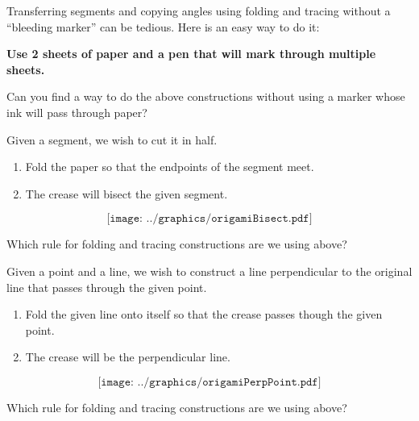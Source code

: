 Transferring segments and copying angles using folding and tracing without a
``bleeding marker'' can be tedious. Here is an easy way to do it: 
\begin{center}
\textbf{Use 2 sheets of paper and a pen that will mark through multiple
sheets.}
\end{center}

\begin{question} 
Can you find a way to do the above constructions without using a
marker whose ink will pass through paper?
\end{question}
\QM

\begin{construction} 
Given a segment, we wish to cut it in half.
\begin{enumerate}
\item Fold the paper so that the endpoints of the segment meet.
\item The crease will bisect the given segment.
\end{enumerate}
\[
\texttt{[image: ../graphics/origamiBisect.pdf]}
\]
\end{construction}

\begin{question} 
Which rule for folding and tracing constructions are we using above?
\end{question}
\QM


\begin{construction}  
Given a point and a line, we wish to construct a line perpendicular to
the original line that passes through the given point.
\begin{enumerate}
\item Fold the given line onto itself so that the crease passes though
  the given point.
\item The crease will be the perpendicular line.
\end{enumerate}
\[
\texttt{[image: ../graphics/origamiPerpPoint.pdf]}
\]
\end{construction}


\begin{question} Which rule for folding and tracing constructions are we using above?
\end{question}
\QM




